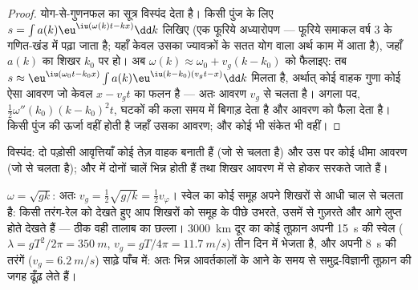 \begin{proof}
योग-से-गुणनफल का सूत्र विस्पंद देता है। किसी पुंज के लिए $s =
\int a(k)\eu^{\iu(\omega(k)t - kx)}\dd k$ लिखिए (एक फूरिये अध्यारोपण ---
फूरिये समाकल वर्ष 3 के गणित-खंड में पढ़ा जाता है; यहाँ केवल
उसका ज्यावक्रों के सतत योग वाला अर्थ काम में आता है), जहाँ
$a(k)$ का शिखर $k_0$ पर हो। अब $\omega(k) \approx \omega_0 + v_g(k - k_0)$ को फैलाइए: तब
$s \approx \eu^{\iu(\omega_0t - k_0x)}\int a(k)\eu^{\iu(k - k_0)(v_gt - x)}\dd k$ मिलता है, अर्थात् कोई
वाहक गुणा कोई ऐसा आवरण जो केवल $x - v_gt$ का फलन है --- अतः
आवरण $v_g$ से चलता है। अगला पद, $\tfrac12\omega''(k_0)(k - k_0)^2t$,
घटकों की कला समय में बिगाड़ देता है और आवरण को फैला देता है। किसी पुंज की
ऊर्जा वहीं होती है जहाँ उसका आवरण; और कोई भी संकेत भी वहीं।
\end{proof}

\begin{omfigure}

{\small विस्पंद: दो पड़ोसी आवृत्तियाँ कोई तेज़ वाहक बनाती हैं
(जो  से चलता है) और उस पर कोई धीमा आवरण (जो  से चलता है); और  में दोनों चालें भिन्न होती हैं तथा
शिखर आवरण में से होकर सरकते जाते हैं।}
\end{omfigure}

\begin{example}[गहरा पानी: शिखर समूह से आगे निकल जाते हैं]\label{ex:b2:dispersion-wave-packets:deepwater}
$\omega = \sqrt{gk}$: अतः $v_g = \tfrac12\sqrt{g/k} = \tfrac12v_\varphi$। स्वेल का कोई
समूह अपने शिखरों से आधी चाल से चलता है: किसी तरंग-रेल को देखते हुए
आप शिखरों को समूह के पीछे उभरते, उसमें से गुज़रते और
आगे लुप्त होते देखते हैं --- ठीक वही तालाब का छल्ला। \qty{3000}{km} दूर
का कोई तूफ़ान अपनी \qty{15}{s} की स्वेल ($\lambda = gT^2/2\pi = \qty{350}{m}$, $v_g =
gT/4\pi = \qty{11.7}{m/s}$) तीन दिन में भेजता है, और अपनी \qty{8}{s} की तरंगें ($v_g =
\qty{6.2}{m/s}$) साढ़े पाँच में: अतः भिन्न आवर्तकालों के आने के समय से
समुद्र-विज्ञानी तूफ़ान की जगह ढूँढ़ लेते हैं।
\end{example}

